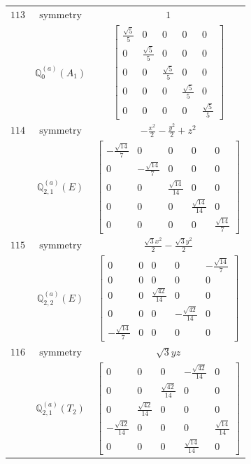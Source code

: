 \documentclass[fleqn,8pt,landscape]{jsarticle}
\begin{document}
\begin{longtable}{ccc}
$ 113 $ & $ \text{symmetry} $ & $ 1 $ \\
$  $ & $ \mathbb{Q}_{0}^{(a)}(A_{1}) $ & $ \begin{bmatrix} \frac{\sqrt{5}}{5} & 0 & 0 & 0 & 0 \\ 0 & \frac{\sqrt{5}}{5} & 0 & 0 & 0 \\ 0 & 0 & \frac{\sqrt{5}}{5} & 0 & 0 \\ 0 & 0 & 0 & \frac{\sqrt{5}}{5} & 0 \\ 0 & 0 & 0 & 0 & \frac{\sqrt{5}}{5} \end{bmatrix} $ \\ \hline
$ 114 $ & $ \text{symmetry} $ & $ - \frac{x^{2}}{2} - \frac{y^{2}}{2} + z^{2} $ \\
$  $ & $ \mathbb{Q}_{2,1}^{(a)}(E) $ & $ \begin{bmatrix} - \frac{\sqrt{14}}{7} & 0 & 0 & 0 & 0 \\ 0 & - \frac{\sqrt{14}}{7} & 0 & 0 & 0 \\ 0 & 0 & \frac{\sqrt{14}}{14} & 0 & 0 \\ 0 & 0 & 0 & \frac{\sqrt{14}}{14} & 0 \\ 0 & 0 & 0 & 0 & \frac{\sqrt{14}}{7} \end{bmatrix} $ \\ \hline
$ 115 $ & $ \text{symmetry} $ & $ \frac{\sqrt{3} x^{2}}{2} - \frac{\sqrt{3} y^{2}}{2} $ \\
$  $ & $ \mathbb{Q}_{2,2}^{(a)}(E) $ & $ \begin{bmatrix} 0 & 0 & 0 & 0 & - \frac{\sqrt{14}}{7} \\ 0 & 0 & 0 & 0 & 0 \\ 0 & 0 & \frac{\sqrt{42}}{14} & 0 & 0 \\ 0 & 0 & 0 & - \frac{\sqrt{42}}{14} & 0 \\ - \frac{\sqrt{14}}{7} & 0 & 0 & 0 & 0 \end{bmatrix} $ \\ \hline
$ 116 $ & $ \text{symmetry} $ & $ \sqrt{3} y z $ \\
$  $ & $ \mathbb{Q}_{2,1}^{(a)}(T_{2}) $ & $ \begin{bmatrix} 0 & 0 & 0 & - \frac{\sqrt{42}}{14} & 0 \\ 0 & 0 & \frac{\sqrt{42}}{14} & 0 & 0 \\ 0 & \frac{\sqrt{42}}{14} & 0 & 0 & 0 \\ - \frac{\sqrt{42}}{14} & 0 & 0 & 0 & \frac{\sqrt{14}}{14} \\ 0 & 0 & 0 & \frac{\sqrt{14}}{14} & 0 \end{bmatrix} $ \\ \hline

\end{longtable}
\end{document}
